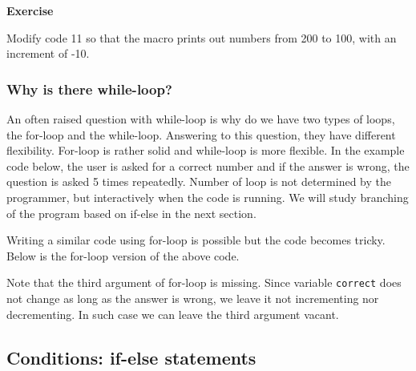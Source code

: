 \documentclass[11pt,a4paper,oneside]{report}
\newenvironment{indentexercise}[1]%
{{\setlength{\leftmargin}{2em}}%
\textbf{Exercise \thesubsection-#1}%
\begin{list}{}%
	\item%
}
{\end{list}}
\newcommand{\ilcom}[1]{\texttt{\small#1}}
\begin{document}
\begin{indentexercise}{3}
Modify code 11 so that the macro prints out numbers from 200 to 100, with an increment of -10. 
\end{indentexercise}

\subsubsection{Why is there while-loop?}

An often raised question with while-loop is why do we have two types of loops, 
the for-loop and the while-loop. Answering to this question, they have different
flexibility. For-loop is rather solid and while-loop is more flexible. In the
example code below, the user is asked for a correct number and if the answer is wrong, the
question is asked 5 times repeatedly. Number of loop is not determined by the
programmer, but interactively when the code is running. We will study
branching of the program based on if-else in the next section.  



Writing a similar code using for-loop is possible but the code becomes tricky.
Below is the for-loop version of the above code.  



Note that the third argument of for-loop is missing. Since variable
\ilcom{correct} does not change as long as the answer is wrong, we leave it not
incrementing nor decrementing. In such case we can leave the third argument
vacant. 

\subsection{Conditions: if-else statements}
\end{document}
